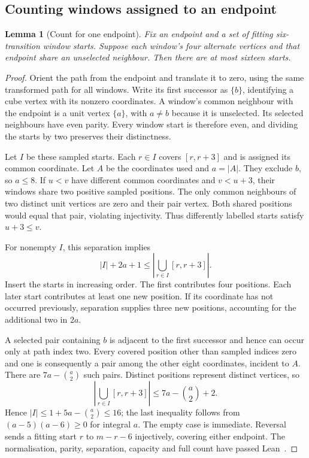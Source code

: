 \documentclass[11pt,a4paper]{article}
\newtheorem{lemma}[theorem]{Lemma}
\theoremstyle{definition}
\theoremstyle{remark}
\begin{document}
\subsection{Counting windows assigned to an endpoint}\label{sec:endpoint-occurrences}
\begin{lemma}[Count for one endpoint]\label{lem:sixteen-endpoint-windows}
Fix an endpoint and a set of fitting six-transition window starts. Suppose
each window's four alternate vertices and that endpoint share an unselected
neighbour. Then there are at most sixteen starts.
\end{lemma}
\begin{proof}
Orient the path from the endpoint and translate it to zero, using the same
transformed path for all windows. Write its first successor as $\{b\}$,
identifying a cube vertex with its nonzero coordinates. A window's common
neighbour with the endpoint is a unit vertex $\{a\}$, with $a\ne b$
because it is unselected. Its selected neighbours have even parity. Every
window start is therefore even, and dividing the starts by two preserves
their distinctness.

Let $I$ be these sampled starts. Each $r\in I$ covers $[r,r+3]$ and is
assigned its common coordinate. Let $A$ be the coordinates used and $a=|A|$.
They exclude $b$, so $a\le8$. If $u<v$ have different common coordinates
and $v<u+3$, their windows share two positive sampled positions. The only
common neighbours of two distinct unit vertices are zero and their pair
vertex. Both shared positions would equal that pair, violating injectivity.
Thus differently labelled starts satisfy $u+3\le v$.

For nonempty $I$, this separation implies
\[
|I|+2a+1\le\left|\bigcup_{r\in I}[r,r+3]\right|.
\]
Insert the starts in increasing order. The first contributes four positions.
Each later start contributes at least one new position. If its coordinate
has not occurred previously, separation supplies three new positions,
accounting for the additional two in $2a$.

A selected pair containing $b$ is adjacent to the first successor and hence
can occur only at path index two. Every covered position other than sampled
indices zero and one is consequently a pair among the other eight coordinates,
incident to $A$. There are $7a-\binom a2$ such pairs. Distinct positions
represent distinct vertices, so
\[
\left|\bigcup_{r\in I}[r,r+3]\right|\le7a-\binom a2+2.
\]
Hence $|I|\le1+5a-\binom a2\le16$; the last inequality follows from
$(a-5)(a-6)\ge0$ for integral $a$. The empty case is immediate.
Reversal sends a fitting start $r$ to $m-r-6$ injectively, covering either
endpoint. The normalisation, parity, separation, capacity and full count
have passed Lean~\cite{occurrencearchive}.
\end{proof}
\end{document}
